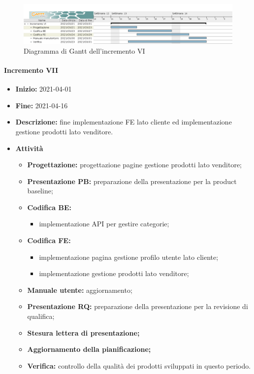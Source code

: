 \begin{figure}[H]
    \centering
    \includegraphics[width=1\linewidth]{res/images/pianificazione/incremento_6.png}
    \caption{Diagramma di Gantt dell'incremento VI}
    \label{fig:_Gantt incremento VI}
\end{figure}

\paragraph[Incremento VII]{Incremento VII}
\begin{itemize}
    \item [] \textbf{Inizio:} 2021-04-01
    \item [] \textbf{Fine:} 2021-04-16
    \item [] \textbf{Descrizione:} fine implementazione FE lato cliente ed implementazione gestione prodotti lato venditore.
    \item [] \textbf{Attività}
          \begin{itemize}
              \item \textbf{Progettazione:} progettazione pagine gestione prodotti lato venditore;
              \item \textbf{Presentazione PB:} preparazione della presentazione per la product baseline;
              \item \textbf{Codifica BE:}
                    \begin{itemize}
                        \item implementazione API per gestire categorie;
                    \end{itemize}
              \item \textbf{Codifica FE:}
                    \begin{itemize}
                        \item implementazione pagina gestione profilo utente lato cliente;
                        \item implementazione gestione prodotti lato venditore;
                    \end{itemize}
              \item \textbf{Manuale utente:} aggiornamento;
              \item \textbf{Presentazione RQ:} preparazione della presentazione per la revisione di qualifica;
              \item \textbf{Stesura lettera di presentazione;}
              \item \textbf{Aggiornamento della pianificazione;}
              \item \textbf{Verifica:} controllo della qualità dei prodotti sviluppati in questo periodo.
          \end{itemize}
\end{itemize}

